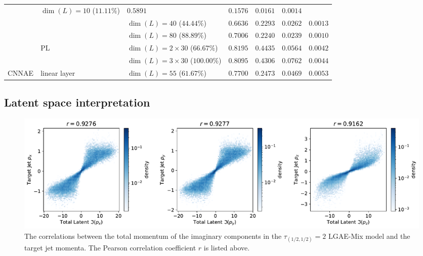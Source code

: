 \begin{table}[ht!]
{\begin{tabular}{llllccc }
                                     & $\dim(L) = 10$ ($11.11\%$)          & $0.5891$                             & $0.1576$          & $0.0161$                  & $\mathit{0.0014}$                                     \\
                                     &                                     & $\dim(L) = 40$ ($44.44\%$)           & $0.6636$          & $\mathit{0.2293}$         & $\mathit{0.0262}$         & $0.0013$                  \\
                                     &                                     & $\dim(L) = 80$ ($88.89\%$)           & $\mathit{0.7006}$ & $0.2240$                  & $0.0239$                  & $0.0010$                  \\[1mm]
                                     & \multirow{2}{*}{PL}
                                     & $\dim(L) = 2 \times 30$ ($66.67\%$) & $\mathbf{0.8195}$                    & $\mathit{0.4435}$ & $0.0564$                  & $0.0042$                                              \\
                                     &                                     & $\dim(L) = 3 \times 30$ ($100.00\%$) & $0.8095$          & $0.4306$                  & $\mathit{0.0762}$         & $\mathit{0.0044}$         \\[2mm]
       CNNAE & linear layer
       & $\dim(L) = 55$ ($61.67\%$)
       & $0.7700$
       & $0.2473$
       & $0.0469$
       & $0.0053$ \\
        \bottomrule
    \end{tabular}
    }
\end{table}


\subsection{Latent space interpretation}
\label{sec:06_lgae_latent-analysis}

\begin{figure}[ht!]
    \centering
    \includegraphics[width=\linewidth]{figures/06-ML4Jets/lgae/latent-space-analysis/corr.pdf}
    \caption{The correlations between the total momentum of the imaginary components in the $\tau_{(1/2, 1/2)} = 2$ LGAE-Mix model and the target jet momenta.
        The Pearson correlation coefficient $r$ is listed above.
    }
    \label{fig:06_lgae_correlations}
\end{figure}

